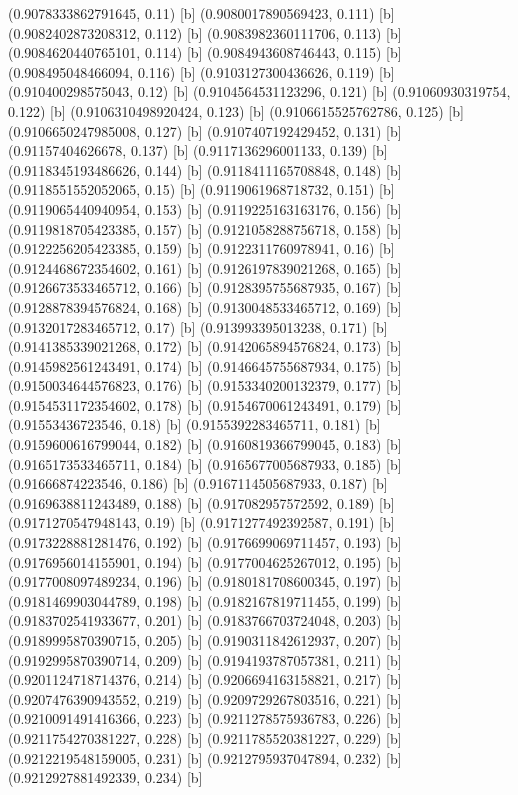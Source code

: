 {{{(0.9078333862791645, 0.11) [b] 
(0.9080017890569423, 0.111) [b] 
(0.9082402873208312, 0.112) [b] 
(0.9083982360111706, 0.113) [b] 
(0.9084620440765101, 0.114) [b] 
(0.9084943608746443, 0.115) [b] 
(0.908495048466094, 0.116) [b] 
(0.9103127300436626, 0.119) [b] 
(0.910400298575043, 0.12) [b] 
(0.9104564531123296, 0.121) [b] 
(0.91060930319754, 0.122) [b] 
(0.9106310498920424, 0.123) [b] 
(0.9106615525762786, 0.125) [b] 
(0.9106650247985008, 0.127) [b] 
(0.9107407192429452, 0.131) [b] 
(0.91157404626678, 0.137) [b] 
(0.9117136296001133, 0.139) [b] 
(0.9118345193486626, 0.144) [b] 
(0.9118411165708848, 0.148) [b] 
(0.9118551552052065, 0.15) [b] 
(0.9119061968718732, 0.151) [b] 
(0.9119065440940954, 0.153) [b] 
(0.9119225163163176, 0.156) [b] 
(0.9119818705423385, 0.157) [b] 
(0.9121058288756718, 0.158) [b] 
(0.9122256205423385, 0.159) [b] 
(0.9122311760978941, 0.16) [b] 
(0.9124468672354602, 0.161) [b] 
(0.9126197839021268, 0.165) [b] 
(0.9126673533465712, 0.166) [b] 
(0.9128395755687935, 0.167) [b] 
(0.9128878394576824, 0.168) [b] 
(0.9130048533465712, 0.169) [b] 
(0.9132017283465712, 0.17) [b] 
(0.913993395013238, 0.171) [b] 
(0.9141385339021268, 0.172) [b] 
(0.9142065894576824, 0.173) [b] 
(0.9145982561243491, 0.174) [b] 
(0.9146645755687934, 0.175) [b] 
(0.9150034644576823, 0.176) [b] 
(0.9153340200132379, 0.177) [b] 
(0.9154531172354602, 0.178) [b] 
(0.9154670061243491, 0.179) [b] 
(0.91553436723546, 0.18) [b] 
(0.9155392283465711, 0.181) [b] 
(0.9159600616799044, 0.182) [b] 
(0.9160819366799045, 0.183) [b] 
(0.9165173533465711, 0.184) [b] 
(0.9165677005687933, 0.185) [b] 
(0.91666874223546, 0.186) [b] 
(0.9167114505687933, 0.187) [b] 
(0.9169638811243489, 0.188) [b] 
(0.917082957572592, 0.189) [b] 
(0.9171270547948143, 0.19) [b] 
(0.9171277492392587, 0.191) [b] 
(0.9173228881281476, 0.192) [b] 
(0.9176699069711457, 0.193) [b] 
(0.9176956014155901, 0.194) [b] 
(0.9177004625267012, 0.195) [b] 
(0.9177008097489234, 0.196) [b] 
(0.9180181708600345, 0.197) [b] 
(0.9181469903044789, 0.198) [b] 
(0.9182167819711455, 0.199) [b] 
(0.9183702541933677, 0.201) [b] 
(0.9183766703724048, 0.203) [b] 
(0.9189995870390715, 0.205) [b] 
(0.9190311842612937, 0.207) [b] 
(0.9192995870390714, 0.209) [b] 
(0.9194193787057381, 0.211) [b] 
(0.9201124718714376, 0.214) [b] 
(0.9206694163158821, 0.217) [b] 
(0.9207476390943552, 0.219) [b] 
(0.9209729267803516, 0.221) [b] 
(0.9210091491416366, 0.223) [b] 
(0.9211278575936783, 0.226) [b] 
(0.9211754270381227, 0.228) [b] 
(0.9211785520381227, 0.229) [b] 
(0.9212219548159005, 0.231) [b] 
(0.9212795937047894, 0.232) [b] 
(0.9212927881492339, 0.234) [b] 
}}}
